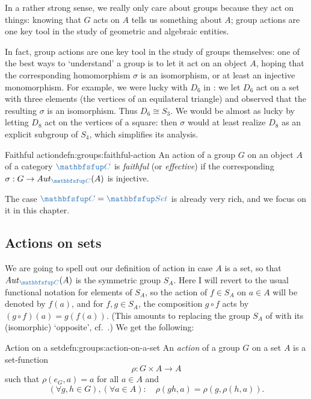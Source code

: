 In a rather strong sense, we really only care about groups because
they act on things: knowing that $G$ acts on $A$ tells us something
about $A$; group actions are one key tool in the study of geometric
and algebraic entities.

In fact, group actions are one key tool in the study of groups
themselves: one of the best ways to `understand' a group is to let it
act on an object $A$, hoping that the corresponding homomorphism
$\sigma$ is an isomorphism, or at least an injective monomorphism. For
example, we were lucky with $D_6$ in
: we let $D_6$ act on a set
with three elements (the vertices of an equilateral triangle) and
observed that the resulting $\sigma$ is an isomorphism. Thus
$D_6 \cong S_3$. We would be almost as lucky by letting $D_8$ act on
the vertices of a square: then $\sigma$ would at least realize $D_8$
as an explicit subgroup of $S_4$, which simplifies its analysis.

\begin{defn}{Faithful action}{defn:groups:faithful-action}
  An action of a group $G$ on an object $A$ of a category $\categ{C}$
  is \emph{faithful} (or \emph{effective}) if the corresponding
  $\sigma : G \to \Aut_{\categ{C}}(A)$ is injective.
\end{defn}

The case $\categ{C} = \categ{Set}$ is already very rich, and we focus
on it in this chapter.

\subsection{Actions on sets}
\label{subsec:groups:actions-on-sets}
We are going to spell out our definition of action in case $A$ is a
set, so that $\Aut_{\categ{C}}(A)$ is the symmetric group $S_A$. Here
I will revert to the usual functional notation for elements of $S_A$,
so the action of $f \in S_A$ on $a \in A$ will be denoted by $f(a)$,
and for $f, g \in S_A$, the composition $g \circ f$ acts by
$(g \circ f)(a) = g(f(a))$. (This amounts to replacing the group $S_A$
of  with its (isomorphic)
`opposite', cf.\ .) We get the
following:

\begin{defn}{Action on a set}{defn:groups:action-on-a-set}
  An \emph{action} of a group $G$ on a set $A$ is a set-function
  \[
    \rho : G \times A \to A
  \]
  such that $\rho(e_G, a) = a$ for all $a \in A$ and
  \[
    (\forall g, h \in G), (\forall a \in A) : \quad \rho(gh, a) =
    \rho(g, \rho(h,a)).
  \]
\end{defn}

